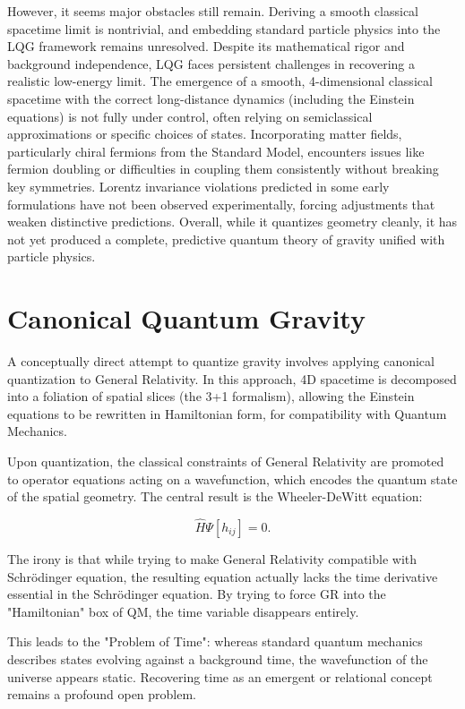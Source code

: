 However, it seems major obstacles still remain. Deriving a smooth classical spacetime limit is nontrivial, and embedding standard particle physics into the LQG framework remains unresolved.
Despite its mathematical rigor and background independence, LQG faces persistent challenges in recovering a realistic low-energy limit. The emergence of a smooth, 4-dimensional classical spacetime with the correct long-distance dynamics (including the Einstein equations) is not fully under control, often relying on semiclassical approximations or specific choices of states. Incorporating matter fields, particularly chiral fermions from the Standard Model, encounters issues like fermion doubling or difficulties in coupling them consistently without breaking key symmetries. Lorentz invariance violations predicted in some early formulations have not been observed experimentally, forcing adjustments that weaken distinctive predictions. Overall, while it quantizes geometry cleanly, it has not yet produced a complete, predictive quantum theory of gravity unified with particle physics.




\section{Canonical Quantum Gravity}

A conceptually direct attempt to quantize gravity involves applying canonical quantization to General Relativity. In this approach, 4D spacetime is decomposed into a foliation of spatial slices (the 3+1 formalism), allowing the Einstein equations to be rewritten in Hamiltonian form, for compatibility with Quantum Mechanics.

Upon quantization, the classical constraints of General Relativity are promoted to operator equations acting on a wavefunction, which encodes the quantum state of the spatial geometry.
The central result is the Wheeler-DeWitt equation:

\[
\hat{H}\Psi[h_{ij}] = 0.
\]

The irony is that while trying to make General Relativity compatible with Schrödinger equation, the resulting equation actually lacks the time derivative essential in the Schrödinger equation. By trying to force GR into the "Hamiltonian" box of QM, the time variable disappears entirely.

This leads to the "Problem of Time": whereas standard quantum mechanics describes states evolving against a background time, the wavefunction of the universe appears static. Recovering time as an emergent or relational concept remains a profound open problem.

